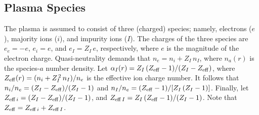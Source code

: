 \documentclass[notitlepage,12pt]{article}
\begin{document}
\subsection{Plasma Species}\label{a3}
The plasma is assumed to consist of three (charged) species; namely,  electrons ($e$), majority ions ($i$), and impurity ions
($I$).  The charges of the  three species are $e_e=-e$, $e_i= e$, and $e_I=Z_I\,e$, respectively, where
$e$ is the magnitude of the electron charge. 
Quasi-neutrality demands that
$n_e= n_i+ Z_I\,n_I$, where $n_a(r)$ is the species-$a$ number density. 
 Let 
$\alpha_I(r) =Z_I\,(Z_{\rm eff}-1)/(Z_I-Z_{\rm eff})$,
where 
$Z_{\rm eff}(r) = (n_i+Z_I^{\,2}\,n_I)/n_e$
is the effective ion charge number. It follows that
$n_i/n_e = (Z_I-Z_{\rm eff})/(Z_I-1)$
and
$n_I/n_e= (Z_{\rm eff}-1)/[Z_I\,(Z_I-1)]$. Finally, let $Z_{{\rm eff}\,i}= (Z_I-Z_{\rm eff})/(Z_I-1)$, and
$Z_{{\rm eff}\,I}=Z_I\,(Z_{\rm eff}-1)/(Z_I-1)$. Note that $Z_{\rm eff}= Z_{{\rm eff}\,i}+ Z_{{\rm eff}\,I}$. 
\end{document}
